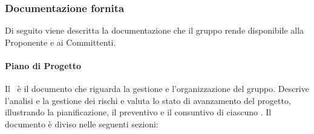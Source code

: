 \subsubsection{Documentazione fornita}\label{documentazionefornita}
Di seguito viene descritta la documentazione che il gruppo rende disponibile alla Proponente e ai Committenti.

\paragraph{Piano di Progetto}
Il \PdP\ è il documento che riguarda la gestione e l'organizzazione del gruppo. Descrive l'analisi e la gestione dei rischi e valuta lo stato di avanzamento del progetto, illustrando la pianificazione, il preventivo e il consuntivo di ciascuno .
Il documento è diviso nelle seguenti sezioni:
